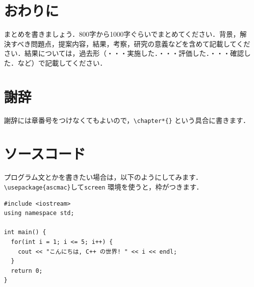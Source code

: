 \documentclass[a4paper,11pt,uplatex]{ujreport}
\begin{document}
\chapter{おわりに}
\label{sec:Conclusion}

まとめを書きましょう．800字から1000字ぐらいでまとめてください．背景，解決すべき問題点，提案内容，結果，考察，研究の意義などを含めて記載してください．結果については，過去形（・・・実施した．・・・評価した．・・・確認した．など）で記載してください．\par

\chapter*{謝辞}
\label{sec:Acknowledgments}

謝辞には章番号をつけなくてもよいので，\verb|\chapter*{}| という具合に書きます．

\appendix
\chapter{ソースコード}
\label{apndx:src}

プログラム文とかを書きたい場合は，以下のようにしてみます．\verb|\usepackage{ascmac}|して\verb|screen| 環境を使うと，枠がつきます．

\begin{screen}\begin{verbatim}
#include <iostream>
using namespace std;

int main() {
  for(int i = 1; i <= 5; i++) {
    cout << "こんにちは, C++ の世界! " << i << endl;
  }
  return 0;
}
\end{verbatim}\end{screen}
\end{document}
